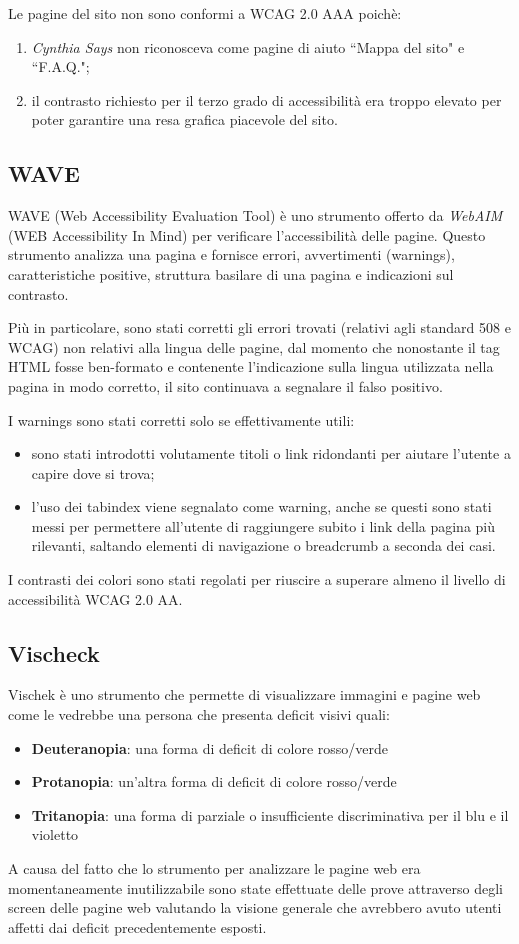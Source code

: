 Le pagine del sito non sono conformi a WCAG 2.0 AAA poichè:
\begin{enumerate}
\item \textit{Cynthia Says} non riconosceva come pagine di aiuto ``Mappa del
sito" e ``F.A.Q.";
\item il contrasto richiesto per il terzo grado di accessibilità era troppo
elevato per poter garantire una resa grafica piacevole del sito.
\end{enumerate}

\subsection{WAVE}
WAVE (Web Accessibility Evaluation Tool) è uno strumento offerto da
\textit{WebAIM} (WEB Accessibility In Mind) per verificare l'accessibilità
delle pagine. Questo strumento analizza una pagina e fornisce errori,
avvertimenti (warnings), caratteristiche positive, struttura basilare di una
pagina e indicazioni sul contrasto.

Più in particolare, sono stati corretti gli errori trovati (relativi agli
standard 508 e WCAG) non relativi alla lingua delle pagine, dal momento che
nonostante il tag HTML fosse ben-formato e contenente l'indicazione sulla
lingua utilizzata nella pagina in modo corretto, il sito continuava a
segnalare il falso positivo.

I warnings sono stati corretti solo se effettivamente utili:
\begin{itemize}
\item sono stati introdotti volutamente titoli o link ridondanti per
aiutare l'utente a capire dove si trova;
\item l'uso dei tabindex viene segnalato come warning, anche se questi sono
stati messi per permettere all'utente di raggiungere subito i link della
pagina più rilevanti, saltando elementi di navigazione o breadcrumb a seconda
dei casi.
\end{itemize}

I contrasti dei colori sono stati regolati per riuscire a superare almeno il
livello di accessibilità WCAG 2.0 AA.

\subsection{Vischeck}
Vischek è uno strumento che permette di visualizzare immagini e pagine web
come le vedrebbe una persona che presenta deficit visivi quali:
\begin{itemize}
\item \textbf{Deuteranopia}: una forma di deficit di colore rosso/verde
\item \textbf{Protanopia}: un'altra forma di deficit di colore rosso/verde
\item \textbf{Tritanopia}: una forma di parziale o insufficiente
discriminativa per il blu e il violetto
\end{itemize}
A causa del fatto che lo strumento per analizzare le pagine web era momentaneamente inutilizzabile sono state effettuate delle prove attraverso degli screen delle pagine web
valutando la visione generale che avrebbero avuto utenti affetti dai deficit precedentemente
esposti.

